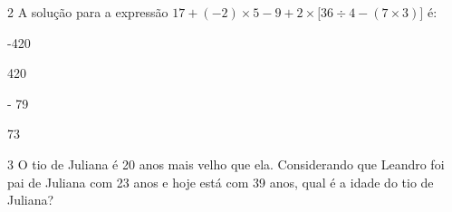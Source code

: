 

\num{2} A solução para a expressão
$17 + ( - 2) \times { 5 - 9 + 2 \times \lbrack 36 \div 4 - ( 7 \times 3 ) \rbrack }$
é:

\begin{escolha}
\item -420
\item 420
\item - 79
\item 73
\end{escolha}



\num{3} O tio de Juliana é 20 anos mais velho que ela. Considerando que
Leandro foi pai de Juliana com 23 anos e hoje está com 39 anos, qual é a
idade do tio de Juliana?

